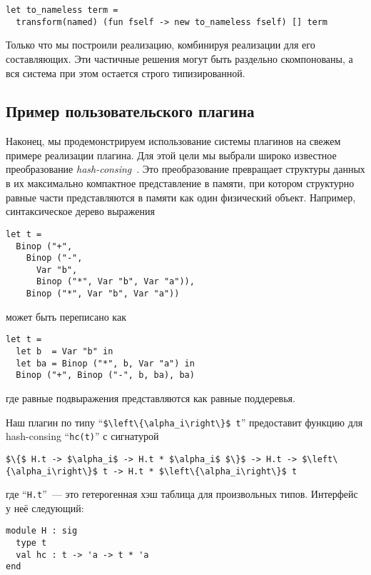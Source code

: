 \begin{lstlisting}
let to_nameless term =
  transform(named) (fun fself -> new to_nameless fself) [] term
\end{lstlisting}

Только что мы построили реализацию, комбинируя реализации для его составляющих. Эти частичные решения могут быть раздельно скомпонованы, а вся система при этом остается строго типизированной.

\subsection{Пример пользовательского плагина}
\label{pluginExample}

Наконец, мы продемонстрируем использование системы плагинов на свежем примере реализации плагина. Для этой цели мы выбрали широко известное преобразование \emph{hash-consing}~\cite{HC}. Это преобразование превращает структуры данных в их максимально компактное представление в памяти, при котором структурно равные части представляются в памяти как один физический объект. Например, синтаксическое дерево выражения

\begin{lstlisting}
let t =
  Binop ("+",
    Binop ("-",
      Var "b",
      Binop ("*", Var "b", Var "a")),
    Binop ("*", Var "b", Var "a"))
\end{lstlisting}
может быть переписано  как

\begin{lstlisting}
let t =
  let b  = Var "b" in
  let ba = Binop ("*", b, Var "a") in
  Binop ("+", Binop ("-", b, ba), ba)  
\end{lstlisting}
где равные подвыражения представляются как равные поддеревья.
 
Наш плагин по типу  ``\lstinline|$\left\{\alpha_i\right\}$ t|'' предоставит функцию для 
hash-consing ``\lstinline{hc(t)}'' с сигнатурой 

\begin{lstlisting}
$\{$ H.t -> $\alpha_i$ -> H.t * $\alpha_i$ $\}$ -> H.t -> $\left\{\alpha_i\right\}$ t -> H.t * $\left\{\alpha_i\right\}$ t
\end{lstlisting}
где ``\lstinline{H.t}''~--- это гетерогенная хэш таблица для произвольных типов. Интерфейс у неё следующий:

\begin{lstlisting}
module H : sig
  type t
  val hc : t -> 'a -> t * 'a
end
\end{lstlisting}

